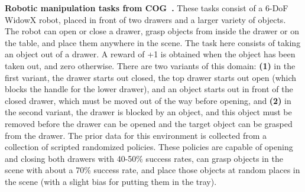 {\bf Robotic manipulation tasks from COG~\citep{singh2020cog}.} These tasks consist of a 6-DoF WidowX robot, placed in front of two drawers and a larger variety of objects. The robot can open or close a drawer, grasp objects from inside the drawer or on the table, and place them anywhere in the scene. The task here consists of taking an object out of a drawer. A reward of +1 is obtained when the object has been taken out, and zero otherwise. There are two variants of this domain: \textbf{(1)} in the first variant, the drawer starts out closed, the top drawer starts out open (which blocks the handle for the lower drawer), and an object starts out in front of the closed drawer,
which must be moved out of the way before opening, and \textbf{(2)} in the second variant, the drawer is blocked by an object, and this object must be removed before the drawer can be opened and the target object can be grasped from the drawer. The prior data for this environment is collected from a collection of scripted randomized policies. These policies are capable of opening and closing both drawers with 40-50\% success rates, can grasp objects in the scene with about a 70\% success rate, and place those objects at random places in the scene (with a slight bias for putting them in the tray). 


